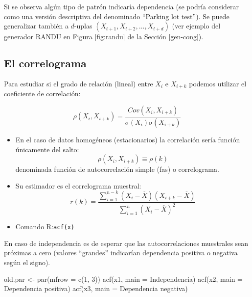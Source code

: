\documentclass[
]{book}
\newenvironment{Shaded}{\begin{snugshade}}{\end{snugshade}}
\newcommand{\AttributeTok}[1]{\textcolor[rgb]{0.77,0.63,0.00}{#1}}
\newcommand{\DecValTok}[1]{\textcolor[rgb]{0.00,0.00,0.81}{#1}}
\newcommand{\FunctionTok}[1]{\textcolor[rgb]{0.00,0.00,0.00}{#1}}
\newcommand{\NormalTok}[1]{#1}
\newcommand{\OtherTok}[1]{\textcolor[rgb]{0.56,0.35,0.01}{#1}}
\newcommand{\StringTok}[1]{\textcolor[rgb]{0.31,0.60,0.02}{#1}}
\theoremstyle{break}
\theoremstyle{definition}
\theoremstyle{definition}
\theoremstyle{definition}
\theoremstyle{definition}
\theoremstyle{remark}
\begin{document}
Si se observa algún tipo de patrón indicaría dependencia (se podría considerar como una versión descriptiva del denominado ``Parking lot test'').
Se puede generalizar también a \(d\)-uplas \((X_{t+1},X_{t+2},\ldots,X_{t+d})\)
(ver ejemplo del generador RANDU en Figura \ref{fig:randu} de la Sección \ref{gen-cong}).

\hypertarget{el-correlograma}{%
\subsection{El correlograma}\label{el-correlograma}}

Para estudiar si el grado de relación (lineal) entre \(X_{i}\) e
\(X_{i+k}\) podemos utilizar el coeficiente de correlación:

\[\rho\left(  X_{i},X_{i+k}\right) = \frac{Cov\left(  X_{i},X_{i+k}\right)    }
{\sigma\left(  X_{i}\right)  \sigma\left(  X_{i+k}\right)  }\]

\begin{itemize}
\item
  En el caso de datos homogéneos (estacionarios) la correlación sería función únicamente del salto:
  \[\rho\left(  X_{i},X_{i+k}\right)  \equiv\rho\left(  k\right)\]
  denominada función de autocorrelación simple (fas) o correlograma.
\item
  Su estimador es el correlograma muestral:
  \[r(k)=\frac{\sum_{i=1}^{n-k}(X_{i}-\overline{X})(X_{i+k}-\overline{X})}
  {\sum_{i=1}^{n}(X_{i}-\overline{X})^{2}}\]
\item
  Comando R:\texttt{acf(x)}
\end{itemize}

En caso de independencia es de esperar que las autocorrelaciones
muestrales sean próximas a cero (valores ``grandes'' indicarían
dependencia positiva o negativa según el signo).

\begin{Shaded}
\begin{Highlighting}[]
\NormalTok{old.par }\OtherTok{\textless{}{-}} \FunctionTok{par}\NormalTok{(}\AttributeTok{mfrow =} \FunctionTok{c}\NormalTok{(}\DecValTok{1}\NormalTok{, }\DecValTok{3}\NormalTok{))}
\FunctionTok{acf}\NormalTok{(x1, }\AttributeTok{main =} \StringTok{\textquotesingle{}Independencia\textquotesingle{}}\NormalTok{)}
\FunctionTok{acf}\NormalTok{(x2, }\AttributeTok{main =} \StringTok{\textquotesingle{}Dependencia positiva\textquotesingle{}}\NormalTok{)}
\FunctionTok{acf}\NormalTok{(x3, }\AttributeTok{main =} \StringTok{\textquotesingle{}Dependencia negativa\textquotesingle{}}\NormalTok{)}
\end{Highlighting}
\end{Shaded}
\end{document}
